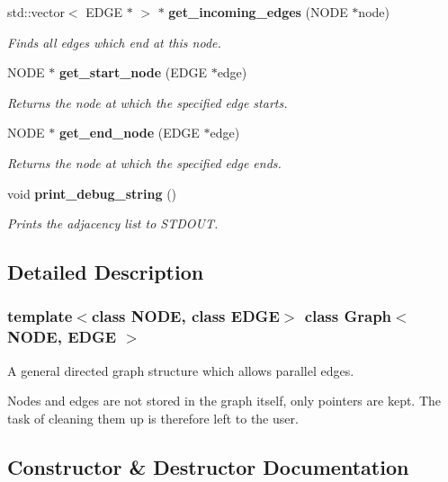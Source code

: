 \begin{CompactItemize}
std::vector$<$ EDGE $\ast$ $>$ $\ast$ {\bf get\_\-incoming\_\-edges} (NODE $\ast$node)
\begin{CompactList}\small\item\em Finds all edges which end at this node. \item\end{CompactList}\item 
NODE $\ast$ {\bf get\_\-start\_\-node} (EDGE $\ast$edge)
\begin{CompactList}\small\item\em Returns the node at which the specified edge starts. \item\end{CompactList}\item 
NODE $\ast$ {\bf get\_\-end\_\-node} (EDGE $\ast$edge)
\begin{CompactList}\small\item\em Returns the node at which the specified edge ends. \item\end{CompactList}\item 
void {\bf print\_\-debug\_\-string} ()\label{classGraph_Grapha10}

\begin{CompactList}\small\item\em Prints the adjacency list to STDOUT. \item\end{CompactList}\end{CompactItemize}


\subsection{Detailed Description}
\subsubsection*{template$<$class NODE, class EDGE$>$ class Graph$<$ NODE, EDGE $>$}

A general directed graph structure which allows parallel edges. 

Nodes and edges are not stored in the graph itself, only pointers are kept. The task of cleaning them up is therefore left to the user. 



\subsection{Constructor \& Destructor Documentation}
